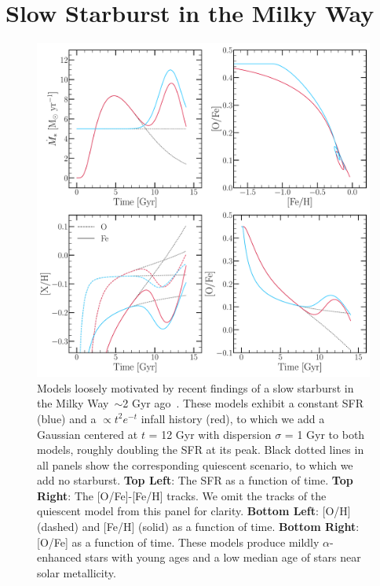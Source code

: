 
\section{Slow Starburst in the Milky Way} 
\label{bursts:sec:slowburst} 

\begin{figure} %
\includegraphics[scale = 0.4]{slow_bursts.pdf} 
\caption{
Models loosely motivated by recent findings of a slow starburst in the Milky 
Way~$\sim$2 Gyr ago~\citep{Mor2019, Isern2019}. These models exhibit a 
constant SFR (blue) and a $\propto t^2e^{-t}$ infall history (red), to which 
we add a Gaussian centered at $t$ = 12 Gyr with dispersion $\sigma$ = 1 Gyr to 
both models, roughly doubling the SFR at its peak. Black dotted lines in all 
panels show the corresponding quiescent scenario, to which we add no starburst. 
\textbf{Top Left}: The SFR as a function of time. 
\textbf{Top Right}: The [O/Fe]-[Fe/H] tracks. We omit the tracks of the 
quiescent model from this panel for clarity. 
\textbf{Bottom Left}: [O/H] (dashed) and [Fe/H] (solid) as a function of time. 
\textbf{Bottom Right}: [O/Fe] as a function of time. 
These models produce mildly $\alpha$-enhanced stars with young ages and a low 
median age of stars near solar metallicity. 
} 
\label{bursts:fig:slow_bursts} 
\end{figure} 

